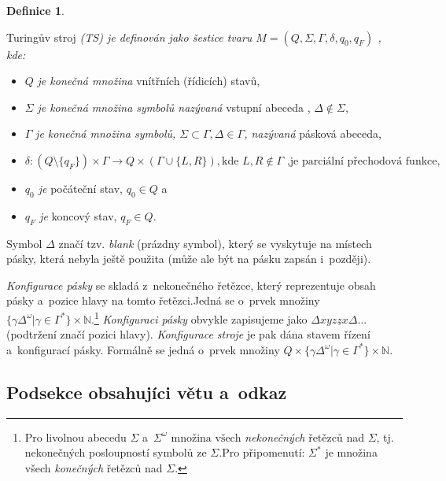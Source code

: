 \documentclass[11pt,a4paper,twocolumn]{article}
\theoremstyle{definition}
\newtheorem{definice}{Definice}
\theoremstyle{plain}
\begin{document}
\begin{definice}\label{definice}

Turingův stroj \textit{(TS) je definován jako šestice tvaru $M = (Q ,\Sigma ,\Gamma , \delta , q_0 , q_F)$ , kde:}

\begin{itemize}
	
	\item $Q$ \textit{je konečná množina} vnítřních (řídicích) stavů,
	\item $\Sigma$\textit{ je konečná množina symbolů nazývaná} vstupní abeceda , $\Delta \notin \Sigma$,
	\item $\Gamma$\textit{ je konečná množina symbolů, $\Sigma \subset \Gamma , \Delta  \in \Gamma$, nazývaná} pásková abeceda,
	
	\item {\textit{$\delta:(Q\setminus\{q_F\})\times\Gamma\rightarrow Q\times(\Gamma\cup\{L,R\}),\text{kde }L,R\notin\Gamma\text{ ,je parciální přechodová funkce},$}}

 	\item \textit{$q_0$ je} počáteční stav, $q_0 \in Q$ a
 	
 	\item \textit{$q_F$ je} koncový stav, $q_F \in Q$.
	   
\end{itemize}

Symbol $\Delta$ značí tzv. \textit{blank} (prázdny symbol), který se vyskytuje na místech pásky, která nebyla ještě použita (může ale být na pásku zapsán i~později).

\textit{Konfigurace pásky} se skladá z~nekonečného řetězce, který reprezentuje obsah pásky a~pozice hlavy na tomto řetězci.Jedná se o~prvek množiny$\{\gamma\Delta^\omega|\gamma\in\Gamma^*\}\times\mathbb{N}.$\footnote{Pro livolnou abecedu $\Sigma$ a~$\Sigma^\omega \text{ množina všech } $\textit{nekonečných} řetězců nad $\Sigma$, tj. nekonečných posloupností symbolů ze $\Sigma$.Pro připomenutí: $\Sigma^*$ je množina všech \textit{konečných} řetězců nad $\Sigma$.}
\textit{Konfiguraci pásky} obvykle zapisujeme jako $\Delta xyz\underline{z}x\Delta...$(podtržení značí pozici hlavy).\textit{ Konfigurace stroje} je pak dána stavem řízení a~konfigurací pásky. Formálně se jedná o~prvek množiny $Q\times\{\gamma\Delta^\omega|\gamma\in\Gamma^*\}\times\mathbb{N}.$
\end{definice}\label{definice}


\subsection{Podsekce obsahujíci větu a~odkaz}
\end{document}
